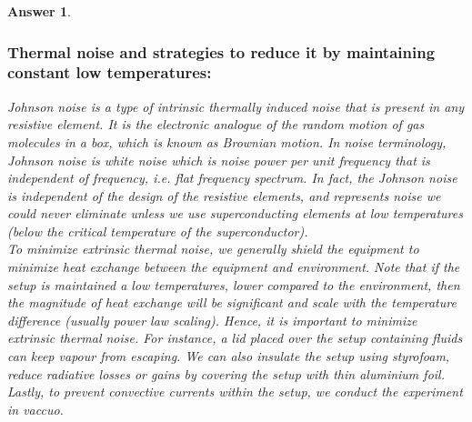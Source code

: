 \documentclass[a4paper]{article}
\newtheorem{ans}{Answer}[subsection]
\theoremstyle{new}
\begin{document}
\begin{ans}
\subsubsection*{Thermal noise and strategies to reduce it by maintaining constant low temperatures:}
Johnson noise is a type of intrinsic thermally induced noise that is present in any resistive element. It is the electronic analogue of the random motion of gas molecules in a box, which is known as Brownian motion. In noise terminology, Johnson noise is white noise which is noise power per unit frequency that is independent of frequency, i.e. flat frequency spectrum. In fact, the Johnson noise is independent of the design of the resistive elements, and represents noise we could never eliminate unless we use superconducting elements at low temperatures (below the critical temperature of the superconductor).\\[5pt]
To minimize extrinsic thermal noise, we generally shield the equipment to minimize heat exchange between the equipment and environment. Note that if the setup is maintained a low temperatures, lower compared to the environment, then the magnitude of heat exchange will be significant and scale with the temperature difference (usually power law scaling). Hence, it is important to minimize extrinsic thermal noise. For instance, a lid placed over the setup containing fluids can keep vapour from escaping. We can also insulate the setup using styrofoam, reduce radiative losses or gains by covering the setup with thin aluminium foil. Lastly, to prevent convective currents within the setup, we conduct the experiment in vaccuo. 

\end{ans}
\end{document}
